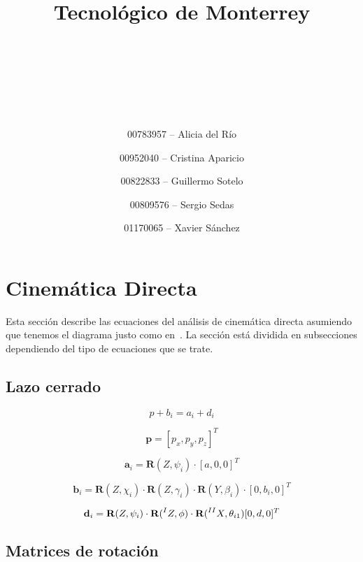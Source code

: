 \documentclass[titlepage, letterpaper, fleqn]{article}
\title{
\vspace{1in}
\textbf{Tecnológico de Monterrey} \\
\vspace{0.5in}
\textmd{\mahclass} \\
\large{\textit{\mahteacher}} \\
\vspace{0.5in}
\textsc{\mahtitle}\\
\author{00783957 -- Alicia del Río \\
\and 00952040 -- Cristina Aparicio \\
\and 00822833 -- Guillermo Sotelo \\
\and 00809576 -- Sergio Sedas \\
\and 01170065 -- Xavier Sánchez}
\date{\mahdate}
}
\let\bs\mathbf
\begin{document}
\begin{titlepage}
\maketitle
\end{titlepage}

%
%

\section{Cinemática Directa} %
\label{sec:forward}

Esta sección describe las ecuaciones del análisis de cinemática directa asumiendo que tenemos el diagrama justo como en~\cite{Rodriguez-Leal2011}.
La sección está dividida en subsecciones dependiendo del tipo de ecuaciones que se trate.

\subsection{Lazo cerrado} %
\label{subsec:loop_closure}


\begin{equation}
    \label{eq:loop_closure}
    p+b_i = a_i + d_i
\end{equation}

\begin{equation}
    \label{eq:p_vector}
    \bs{p} = [p_x,p_y,p_z]^T
\end{equation}

\begin{equation}
    \label{eq:a_vector}
    \bs{a}_i = \bs{R}(Z,\psi_i) \cdot [a,0,0]^T
\end{equation}

\begin{equation}
    \label{eq:b_vector}
    \bs{b}_i = \bs{R}(Z,\chi_i)\cdot \bs{R}(Z, \gamma_i) \cdot \bs{R}(Y, \beta_i) \cdot [0, b_i, 0]^T
\end{equation}

\begin{equation}
    \label{eq:d_vector}
    \bs{d}_i = \bs{R}(Z,\psi_i) \cdot \bs{R}(\prescript{I}{}{Z},\phi) \cdot \bs{R}(\prescript{II}{}{X}, \theta_{i1})[0,d,0]^T
\end{equation}

\subsection{Matrices de rotación} %
\label{subsec:rotations}
\end{document}
